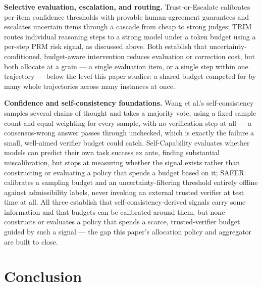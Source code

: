 \documentclass[11pt]{article}
\begin{document}
\textbf{Selective evaluation, escalation, and routing.} Trust-or-Escalate \citep{TrustOrEscalate2607} calibrates per-item confidence thresholds with provable human-agreement guarantees and escalates uncertain items through a cascade from cheap to strong judges; TRIM \citep{TRIM2607} routes individual reasoning steps to a strong model under a token budget using a per-step PRM risk signal, as discussed above. Both establish that uncertainty-conditioned, budget-aware intervention reduces evaluation or correction cost, but both allocate at a grain --- a single evaluation item, or a single step within one trajectory --- below the level this paper studies: a shared budget competed for by many whole trajectories across many instances at once.

\textbf{Confidence and self-consistency foundations.} Wang et al.'s \citep{WangSelfConsistency2023} self-consistency samples several chains of thought and takes a majority vote, using a fixed sample count and equal weighting for every sample, with no verification step at all --- a consensus-wrong answer passes through unchecked, which is exactly the failure a small, well-aimed verifier budget could catch. Self-Capability \citep{SelfCapability2607} evaluates whether models can predict their own task success ex ante, finding substantial miscalibration, but stops at measuring whether the signal exists rather than constructing or evaluating a policy that spends a budget based on it; SAFER \citep{SAFER2607} calibrates a sampling budget and an uncertainty-filtering threshold entirely offline against admissibility labels, never invoking an external trusted verifier at test time at all. All three establish that self-consistency-derived signals carry some information and that budgets can be calibrated around them, but none constructs or evaluates a policy that spends a scarce, trusted-verifier budget guided by such a signal --- the gap this paper's allocation policy and aggregator are built to close.

\section{Conclusion}
\end{document}
